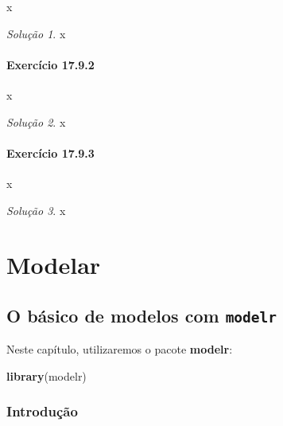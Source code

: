 \documentclass[
]{latex/krantz}
\newenvironment{Shaded}{\begin{snugshade}}{\end{snugshade}}
\newcommand{\FunctionTok}[1]{\textcolor[rgb]{0.13,0.29,0.53}{\textbf{#1}}}
\newcommand{\NormalTok}[1]{#1}
\theoremstyle{definition}
\theoremstyle{definition}
\theoremstyle{definition}
\theoremstyle{definition}
\theoremstyle{remark}
\newtheorem*{solution}{Solução}
\begin{document}
x

\begin{solution}
x
\end{solution}

\hypertarget{exr17-9-2}{%
\subsection*{Exercício 17.9.2}\label{exr17-9-2}}

x

\begin{solution}
x
\end{solution}

\hypertarget{exr17-9-3}{%
\subsection*{Exercício 17.9.3}\label{exr17-9-3}}

x

\begin{solution}
x
\end{solution}

\hypertarget{part-modelar}{%
\part{Modelar}\label{part-modelar}}

\hypertarget{o-buxe1sico-de-modelos-com-modelr}{%
\chapter{\texorpdfstring{O básico de modelos com \texttt{modelr}}{O básico de modelos com modelr}}\label{o-buxe1sico-de-modelos-com-modelr}}

Neste capítulo, utilizaremos o pacote \textbf{modelr}:

\begin{Shaded}
\begin{Highlighting}[]
\FunctionTok{library}\NormalTok{(modelr)}
\end{Highlighting}
\end{Shaded}

\hypertarget{introduuxe7uxe3o-14}{%
\section{Introdução}\label{introduuxe7uxe3o-14}}
\end{document}
